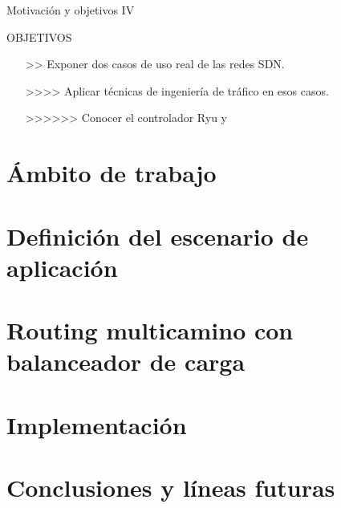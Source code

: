 \documentclass[10pt,spanish]{beamer}
\begin{document}
\begin{frame}{Motivación y objetivos IV}
\begin{alertblock}{OBJETIVOS}
\begin{itemize}
	\item[>>] Exponer dos casos de uso real de las redes SDN.
	\item[>>>>] Aplicar técnicas de ingeniería de tráfico en esos casos.
	\item[>>>>>>] Conocer el controlador Ryu y 
\end{itemize}
\end{alertblock}

\end{frame}





\section{Ámbito de trabajo}
\section{Definición del escenario de aplicación}
\section{Routing multicamino con balanceador de carga}
\section{Implementación}
\section{Conclusiones y líneas futuras}
\end{document}
